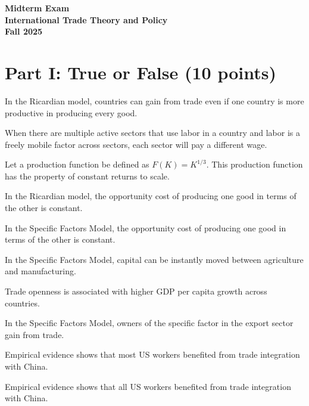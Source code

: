 \documentclass[11pt,letterpaper]{exam}
\begin{document}
\begin{center}
{\large
\textbf{Midterm Exam\\International Trade Theory and Policy\\Fall 2025}
}
\end{center}

\section*{Part I: True or False (10 points)}

\begin{questions}
\question In the Ricardian model, countries can gain from trade even if one country is more productive in producing every good.

\question When there are multiple active sectors that use labor in a country and labor is a freely mobile factor across sectors, each sector will pay a different wage.

\question Let a production function be defined as $F(K) = K^{1/3}$. This production function has the property of constant returns to scale.

\question In the Ricardian model, the opportunity cost of producing one good in terms of the other is constant.

\question In the Specific Factors Model, the opportunity cost of producing one good in terms of the other is constant.



\question In the Specific Factors Model, capital can be instantly moved between agriculture and manufacturing.

\question Trade openness is associated with higher GDP per capita growth across countries.


\question In the Specific Factors Model, owners of the specific factor in the export sector gain from trade.

\question Empirical evidence shows that most US workers benefited from trade integration with China.

\question Empirical evidence shows that all US workers benefited from trade integration with China.
\end{questions}
\end{document}
